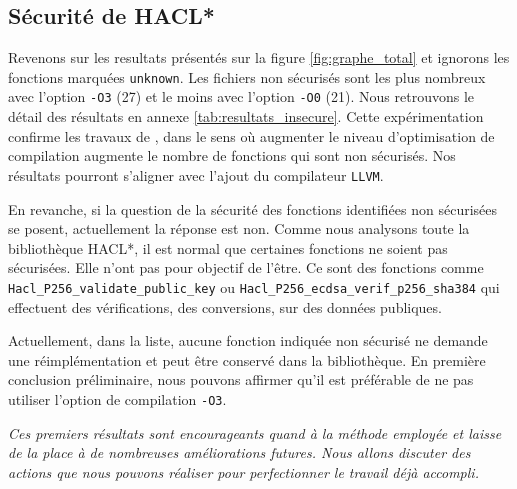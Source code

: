 \subsection*{Sécurité de HACL*}

Revenons sur les resultats présentés sur la figure \ref{fig:graphe_total} et ignorons les fonctions marquées \texttt{unknown}. Les fichiers non sécurisés sont les plus nombreux avec l'option \texttt{-O3} (27) et le moins avec l'option \texttt{-O0} (21). Nous retrouvons le détail des résultats en annexe \ref{tab:resultats_insecure}. Cette expérimentation confirme les travaux de \citeauthor{schneider2024breakingbadcompilersbreak}, dans le sens où augmenter le niveau d'optimisation de compilation augmente le nombre de fonctions qui sont non sécurisés. Nos résultats pourront s'aligner avec l'ajout du compilateur \texttt{LLVM}.\smallbreak 

En revanche, si la question de la sécurité des fonctions identifiées non sécurisées se posent, actuellement la réponse est non. Comme nous analysons toute la bibliothèque HACL*, il est normal que certaines fonctions ne soient pas sécurisées. Elle n'ont pas pour objectif de l'être. Ce sont des fonctions comme \texttt{Hacl\_P256\_\-vali\-date\_public\_key} ou \texttt{Hacl\_P256\_\-ecdsa\_\-verif\_p256\_sha384} qui effectuent des vérifications, des conversions, sur des données publiques. 

Actuellement, dans la liste, aucune fonction indiquée non sécurisé ne demande une réimplémentation et peut être conservé dans la bibliothèque. En première conclusion préliminaire, nous pouvons affirmer qu'il est préférable de ne pas utiliser l'option de compilation \texttt{-O3}.


\vfill
\textit{Ces premiers résultats sont encourageants quand à la méthode employée et laisse de la place à de nombreuses améliorations futures. Nous allons discuter des actions que nous pouvons réaliser pour perfectionner le travail déjà accompli.}